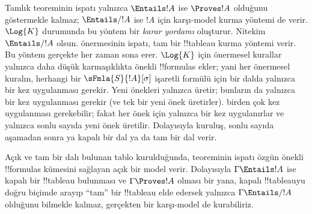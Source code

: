 \documentclass[../../../include/open-logic-section]{subfiles}
\begin{document}
      

\begin{explain}
  Tamlık teoreminin ispatı yalnızca $\Entails !A$ ise $\Proves !A$ olduğunu
  göstermekle kalmaz; $\Entails/ !A$ ise $!A$ için karşı-model kurma yöntemi
  de verir. $\Log{K}$ durumunda bu yöntem bir \emph{karar yordamı} oluşturur.
  Nitekim $\Entails/ !A$ olsun. 
  önermesinin ispatı, tam bir !!{tableau} kurma yöntemi verir. Bu yöntem
  gerçekte her zaman sona erer. $\Log{K}$ için önermesel kurallar yalnızca daha
  düşük karmaşıklıkta önekli !!{formula}s ekler; yani her önermesel kuralın,
  herhangi bir $\sFmla{S}{!A}[\sigma]$ işaretli formülü için bir dalda yalnızca
  bir kez uygulanması gerekir. Yeni önekleri yalnızca
   üretir; bunların da
  yalnızca bir kez uygulanması gerekir (ve tek bir yeni önek üretirler).
   birden çok kez
  uygulanması gerekebilir; fakat her önek için yalnızca bir kez uygulanırlar
  ve yalnızca sonlu sayıda yeni önek üretilir. Dolayısıyla kuruluş, sonlu sayıda
  aşamadan sonra ya kapalı bir dal ya da tam bir dal verir.

  Açık ve tam bir dalı bulunan tablo kurulduğunda,
   teoreminin ispatı özgün önekli
  !!{formula}s kümesini sağlayan açık bir model verir. Dolayısıyla
  $\Gamma \Entails !A$ ise kapalı bir !!{tableau} bulunması ve
  $\Gamma \Proves !A$ olması bir yana, kapalı !!{tableau}{}yu doğru biçimde
  arayıp ``tam'' bir !!{tableau} elde edersek yalnızca
  $\Gamma \Entails/ !A$ olduğunu bilmekle kalmaz, gerçekten bir karşı-model de
  kurabiliriz.
\end{explain}
\end{document}

